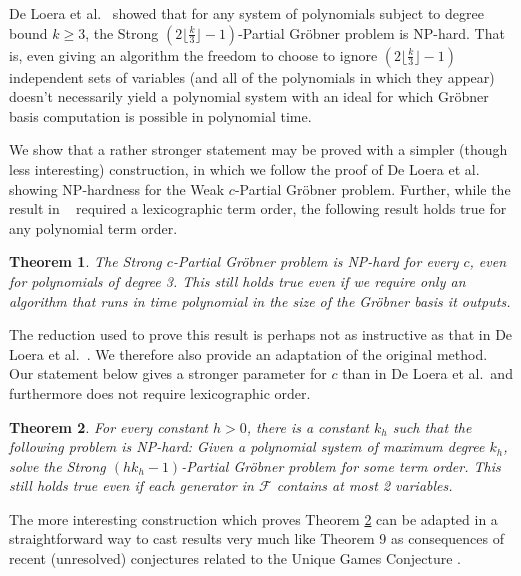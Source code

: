 \documentclass{article}
\newcommand{\F}[0]{\mathcal{F}}
\newtheorem{thm}{Theorem}
\begin{document}
De Loera et al.~\cite{deloera} showed that for any system of polynomials subject to degree bound $k\geq 3$, the Strong $(2\lfloor\frac{k}{3}\rfloor-1)$\nobreakdash-Partial Gr\"{o}bner problem is NP-hard. That is, even giving an algorithm the freedom to choose to ignore $(2\lfloor\frac{k}{3}\rfloor-1)$ independent sets of variables (and all of the polynomials in which they appear) doesn't necessarily yield a polynomial system with an ideal for which Gr\"{o}bner basis computation is possible in polynomial time.










We show that a rather stronger statement may be proved with a simpler (though less interesting) construction, in which we follow the proof of De Loera et al.~\cite{deloera} showing NP-hardness for the Weak $c$\nobreakdash-Partial Gr\"obner problem. Further, while the result in ~\cite{deloera} required a lexicographic term order, the following result holds true for any polynomial term order.

\begin{thm} 
The Strong $c$\nobreakdash-Partial Gr\"obner problem is NP-hard for every $c$, even for polynomials of degree 3.  This still holds true even if we require only an algorithm that runs in time polynomial in the \emph{size of the Gr\"{o}bner basis} it outputs.
\label{thm:stronger}
\end{thm}

The reduction used to prove this result is perhaps not as instructive as that in De Loera et al.~\cite{deloera}. We therefore also provide an adaptation of the original method. Our statement below gives a stronger parameter for $c$ than in De Loera et al.~and furthermore does not require lexicographic order.

\begin{thm}\label{prop:lundgroebner}
For every constant $h>0$, there is a constant $k_h$ such that the following problem is NP-hard: Given a polynomial system of maximum degree $k_h$, solve the Strong $(hk_h-1)$\nobreakdash-Partial Gr\"{o}bner problem for some term order. This still holds true even if each generator in $\F$ contains at most 2 variables.
\end{thm}

The more interesting construction which proves Theorem \ref{prop:lundgroebner} can be adapted in a straightforward way to cast results very much like Theorem 9 as consequences of recent (unresolved) conjectures related to the Unique Games Conjecture \cite{Khot02}.
\end{document}
